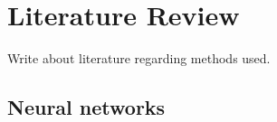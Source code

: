 \chapter{Literature Review}
Write about literature regarding methods used.

\section{Neural networks}

